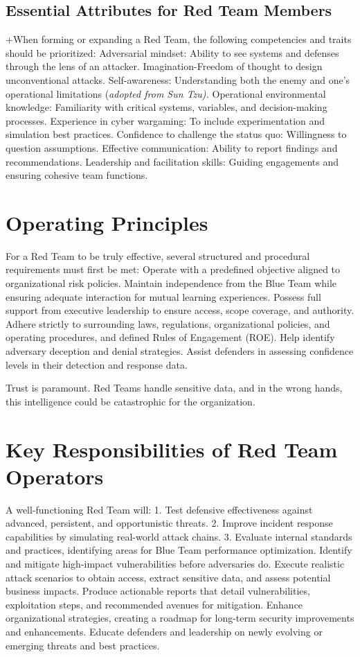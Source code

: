 \subsection{Essential Attributes for Red Team Members}
+When forming or expanding a Red Team, the following competencies and traits should be prioritized:
Adversarial mindset: Ability to see systems and defenses through the lens of an attacker.
Imagination-Freedom of thought to design unconventional attacks.
Self-awareness: Understanding both the enemy and one's operational limitations (\textit{adopted from Sun Tzu).}
Operational environmental knowledge: Familiarity with critical systems, variables, and decision-making processes.
Experience in cyber wargaming: To include experimentation and simulation best practices.
Confidence to challenge the status quo: Willingness to question assumptions.
Effective communication: Ability to report findings and recommendations.
Leadership and facilitation skills: Guiding engagements and ensuring cohesive team functions.

\section{Operating Principles}
For a Red Team to be truly effective, several structured and procedural requirements must first be met:
Operate with a predefined objective aligned to organizational risk policies.
Maintain independence from the Blue Team while ensuring adequate interaction for mutual learning experiences.
Possess full support from executive leadership to ensure access, scope coverage, and authority.
Adhere strictly to surrounding laws, regulations, organizational policies, and operating procedures, and defined Rules of Engagement (ROE).
Help identify adversary deception and denial strategies.
Assist defenders in assessing confidence levels in their detection and response data.

Trust is paramount. Red Teams handle sensitive data, and in the wrong hands, this intelligence could be catastrophic for the organization.

\section{Key Responsibilities of Red Team Operators}
A well-functioning Red Team will:
1. Test defensive effectiveness against advanced, persistent, and opportunistic threats.
2. Improve incident response capabilities by simulating real-world attack chains.
3. Evaluate internal standards and practices, identifying areas for Blue Team performance optimization.
Identify and mitigate high-impact vulnerabilities before adversaries do.
Execute realistic attack scenarios to obtain access, extract sensitive data, and assess potential business impacts.
Produce actionable reports that detail vulnerabilities, exploitation steps, and recommended avenues for mitigation.
Enhance organizational strategies, creating a roadmap for long-term security improvements and enhancements.
Educate defenders and leadership on newly  evolving or emerging threats and best practices.

